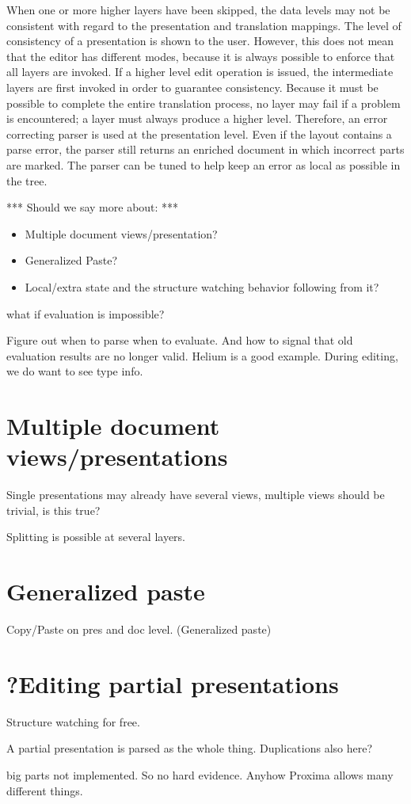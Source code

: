 When one or more higher layers have been skipped, the data levels may not be consistent with regard to the presentation and translation mappings. The level of consistency of a presentation is shown to the user. However, this does not mean that the editor has different modes, because it is always possible to enforce that all layers are invoked. If a higher level edit operation is issued, the intermediate layers are first invoked in order to guarantee consistency. Because it must be possible to complete the entire translation process, no layer may fail if a problem is encountered; a layer must always produce a higher level. Therefore, an error correcting parser is used at the presentation level. Even if the layout contains a parse error, the parser still returns an enriched document in which incorrect parts are marked. The parser can be tuned to help keep an error as local as possible in the tree.

 


*** Should we say more about: ***
\begin{itemize}
\item Multiple document views/presentation?
\item Generalized Paste?
\item Local/extra state and the structure watching behavior following from it?
\end{itemize}

\bc
what if evaluation is impossible?


Figure out when to parse when to evaluate. And how to signal that old evaluation results are no longer valid. Helium is a good example. During editing, we do want to see type info.


\section{Multiple document views/presentations}
 
Single presentations may already have several views, multiple views should be trivial, is  this true?

Splitting is possible at several layers.

\section{Generalized paste}    %

Copy/Paste on pres and doc level. (Generalized paste)

\section{?Editing partial presentations}

Structure watching for free.

A partial presentation is parsed as the whole thing. Duplications also here?


big parts not implemented. So no hard evidence. Anyhow Proxima allows many different  things. 
\ec